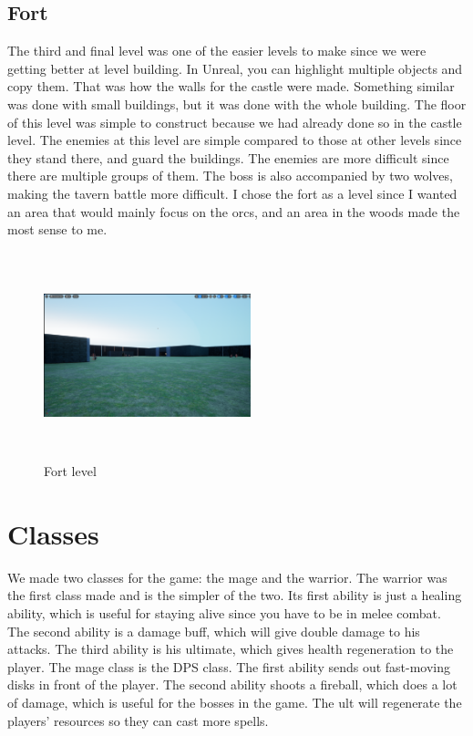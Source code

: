 \documentclass{sigchi}
\begin{document}
\subsection{Fort}
The third and final level was one of the easier levels to make since we were getting better at level building. In Unreal, you can highlight multiple objects and copy them. That was how the walls for the castle were made. Something similar was done with small buildings, but it was done with the whole building. The floor of this level was simple to construct because we had already done so in the castle level. The enemies at this level are simple compared to those at other levels since they stand there, and guard the buildings. The enemies are more difficult since there are multiple groups of them. The boss is also accompanied by two wolves, making the tavern battle more difficult. I chose the fort as a level since I wanted an area that would mainly focus on the orcs, and an area in the woods made the most sense to me.
\begin{figure}


\includegraphics[width=6cm, height=6cm]{Figure/fort.png}  
\caption{Fort level}
\end{figure}
\section{Classes}
We made two classes for the game: the mage and the warrior. The warrior was the first class made and is the simpler of the two. Its first ability is just a healing ability, which is useful for staying alive since you have to be in melee combat. The second ability is a damage buff, which will give double damage to his attacks. The third ability is his ultimate, which gives health regeneration to the player. The mage class is the DPS class. The first ability sends out fast-moving disks in front of the player. The second ability shoots a fireball, which does a lot of damage, which is useful for the bosses in the game. The ult will regenerate the players' resources so they can cast more spells.
\end{document}
